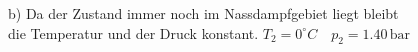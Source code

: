 b) Da der Zustand immer noch im Nassdampfgebiet liegt bleibt \\
die Temperatur und der Druck konstant. $T_2 = 0^\circ C \quad p_2 = 1.40 \, \text{bar}$